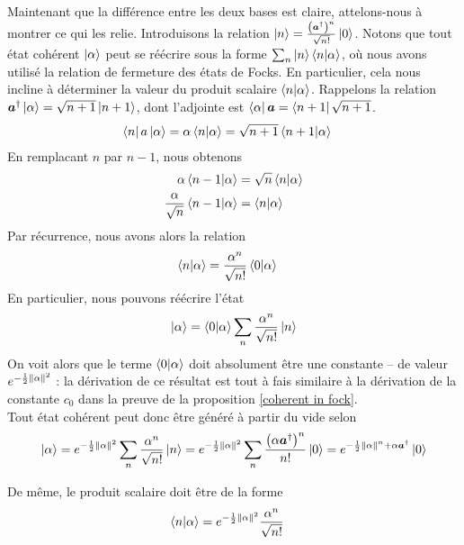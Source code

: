 \documentclass[11pt,oneside,a4paper]{article}
\begin{document}
Maintenant que la différence entre les deux bases est claire, attelons-nous à montrer ce qui les relie. Introduisons la relation $\ket{n} = \frac{\left(\bm{a}^\dagger\right)^n}{\sqrt{n!}}\ket{0}$. Notons que tout état cohérent $\ket{\alpha}$ peut se réécrire sous la forme $\sum_n \ket{n}\braket{n}{\alpha}$, où nous avons utilisé la relation de fermeture des états de Focks. En particulier, cela nous incline à déterminer la valeur du produit scalaire $\braket{n}{\alpha}$. Rappelons la relation $\bm{a}^\dagger\ket{\alpha} = \sqrt{n+1}\ket{n+1}$, dont l'adjointe est $\bra{\alpha}\bm{a} = \bra{n+1}\sqrt{n+1}$.
\begin{align}
  \bra{n}a\ket{\alpha} = \alpha\braket{n}{\alpha} &= \sqrt{n+1}\braket{n+1}{\alpha}
\end{align}
En remplacant $n$ par $n-1$, nous obtenons
\begin{align}
  \alpha\braket{n-1}{\alpha} &= \sqrt{n}\braket{n}{\alpha}\\
  \frac{\alpha}{\sqrt{n}}\braket{n-1}{\alpha} &= \braket{n}{\alpha}
\end{align}
Par récurrence, nous avons alors la relation
\begin{align}
  \braket{n}{\alpha} &= \frac{\alpha^n}{\sqrt{n!}}\braket{0}{\alpha}
\end{align}
En particulier, nous pouvons réécrire l'état
\begin{align}
  \ket{\alpha} = \braket{0}{\alpha} \sum_n \frac{\alpha^n}{\sqrt{n!}}\ket{n}
\end{align}
On voit alors que le terme $\braket{0}{\alpha}$ doit absolument être une constante -- de valeur $e^{-\frac{1}{2}\norm{\alpha}^2}$ : la dérivation de ce résultat est tout à fais similaire à la dérivation de la constante $c_0$ dans la preuve de la proposition \ref{coherent in fock}.\\

Tout état cohérent peut donc être généré à partir du vide selon
\begin{align}
  \label{Création à partir du vide}
  \ket{\alpha} = e^{-\frac{1}{2}\norm{\alpha}^2} \sum_n \frac{\alpha^n}{\sqrt{n!}}\ket{n} = e^{-\frac{1}{2}\norm{\alpha}^2} \sum_n \frac{\left(\alpha\bm{a}^\dagger\right)^n}{n!}\ket{0} = e^{-\frac{1}{2}\norm{\alpha}^n+\alpha\bm{a}^\dagger}\ket{0}
\end{align}

De même, le produit scalaire doit être de la forme
\begin{align}
  \braket{n}{\alpha} &= e^{-\frac{1}{2}\norm{\alpha}^2}\frac{\alpha^n}{\sqrt{n!}}  
\end{align}
\end{document}
